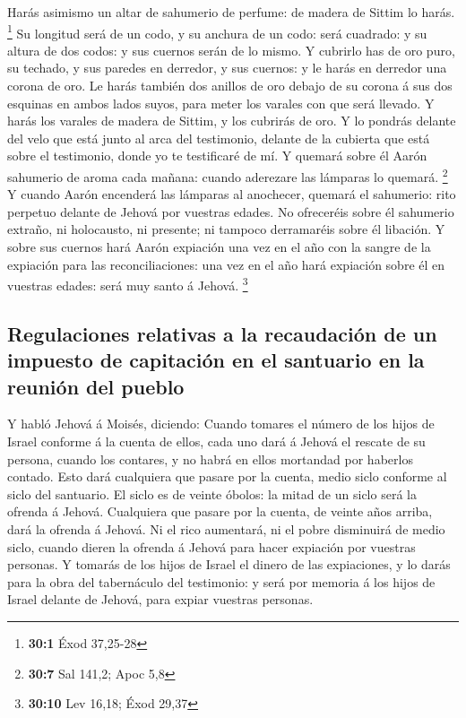  Harás asimismo un altar de sahumerio de perfume: de
madera de Sittim lo harás. \footnote{\textbf{30:1} Éxod 37,25-28}
 Su longitud será de un codo, y su anchura de un codo:
será cuadrado: y su altura de dos codos: y sus cuernos serán de lo
mismo.  Y cubrirlo has de oro puro, su techado, y sus
paredes en derredor, y sus cuernos: y le harás en derredor una corona de
oro.  Le harás también dos anillos de oro debajo de su
corona á sus dos esquinas en ambos lados suyos, para meter los varales
con que será llevado.  Y harás los varales de madera de
Sittim, y los cubrirás de oro.  Y lo pondrás delante del
velo que está junto al arca del testimonio, delante de la cubierta que
está sobre el testimonio, donde yo te testificaré de mí. 
Y quemará sobre él Aarón sahumerio de aroma cada mañana: cuando
aderezare las lámparas lo quemará. \footnote{\textbf{30:7} Sal 141,2;
  Apoc 5,8}  Y cuando Aarón encenderá las lámparas al
anochecer, quemará el sahumerio: rito perpetuo delante de Jehová por
vuestras edades.  No ofreceréis sobre él sahumerio
extraño, ni holocausto, ni presente; ni tampoco derramaréis sobre él
libación.  Y sobre sus cuernos hará Aarón expiación una
vez en el año con la sangre de la expiación para las reconciliaciones:
una vez en el año hará expiación sobre él en vuestras edades: será muy
santo á Jehová. \footnote{\textbf{30:10} Lev 16,18; Éxod 29,37}

\hypertarget{regulaciones-relativas-a-la-recaudaciuxf3n-de-un-impuesto-de-capitaciuxf3n-en-el-santuario-en-la-reuniuxf3n-del-pueblo}{%
\subsection{Regulaciones relativas a la recaudación de un impuesto de
capitación en el santuario en la reunión del
pueblo}\label{regulaciones-relativas-a-la-recaudaciuxf3n-de-un-impuesto-de-capitaciuxf3n-en-el-santuario-en-la-reuniuxf3n-del-pueblo}}

 Y habló Jehová á Moisés, diciendo: 
Cuando tomares el número de los hijos de Israel conforme á la cuenta de
ellos, cada uno dará á Jehová el rescate de su persona, cuando los
contares, y no habrá en ellos mortandad por haberlos contado.
 Esto dará cualquiera que pasare por la cuenta, medio
siclo conforme al siclo del santuario. El siclo es de veinte óbolos: la
mitad de un siclo será la ofrenda á Jehová.  Cualquiera
que pasare por la cuenta, de veinte años arriba, dará la ofrenda á
Jehová.  Ni el rico aumentará, ni el pobre disminuirá de
medio siclo, cuando dieren la ofrenda á Jehová para hacer expiación por
vuestras personas.  Y tomarás de los hijos de Israel el
dinero de las expiaciones, y lo darás para la obra del tabernáculo del
testimonio: y será por memoria á los hijos de Israel delante de Jehová,
para expiar vuestras personas.

